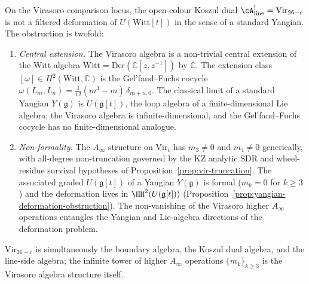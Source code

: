 \begin{proposition}
\label{prop:virasoro-no-yangian-deformation}
On the Virasoro comparison locus, the open-colour Koszul dual
$\cA^!_{\mathrm{line}} = \mathrm{Vir}_{26-c}$ is not a filtered
deformation of $U(\mathrm{Witt}{[t]})$ in the sense of a standard
Yangian. The obstruction is twofold:
\begin{enumerate}[label=\textup{(\alph*)}]
\item \emph{Central extension.}\; The Virasoro algebra is a
 non-trivial central extension of the Witt algebra
 $\mathrm{Witt} = \mathrm{Der}(\mathbb{C}[z,z^{-1}])$ by
 $\mathbb{C}$. The extension class
 $[\omega] \in H^2(\mathrm{Witt}, \mathbb{C})$ is the
 Gel'fand--Fuchs cocycle
 $\omega(L_m, L_n) = \tfrac{1}{12}(m^3 - m)\,\delta_{m+n,0}$.
 The classical limit of a standard Yangian $Y(\mathfrak{g})$ is
 $U(\mathfrak{g}{[t]})$, the loop algebra of a finite-dimensional
 Lie algebra; the Virasoro algebra is infinite-dimensional, and
 the Gel'fand--Fuchs cocycle has no finite-dimensional analogue.
\item \emph{Non-formality.}\; The $A_\infty$ structure on
 $\mathrm{Vir}_c$ has $m_3\ne0$ and $m_4\ne0$ generically, with
 all-degree non-truncation governed by the KZ analytic SDR and
 wheel-residue survival hypotheses of
 Proposition~\ref{prop:vir-truncation}. The associated graded
 $U(\mathfrak{g}{[t]})$ of a Yangian $Y(\mathfrak{g})$ is formal
 ($m_k = 0$ for $k \ge 3$) and the deformation lives in
 $\HH^2(U(\mathfrak{g}{[t]}))$
 (Proposition~\ref{prop:yangian-deformation-obstruction}). The
 non-vanishing of the Virasoro higher $A_\infty$ operations
 entangles the Yangian and Lie-algebra directions of the
 deformation problem.
\end{enumerate}
$\mathrm{Vir}_{26-c}$ is simultaneously the boundary algebra, the
Koszul dual algebra, and the line-side algebra; the infinite tower
of higher $A_\infty$ operations $\{m_k\}_{k \ge 3}$ is the Virasoro
algebra structure itself.
\end{proposition}

